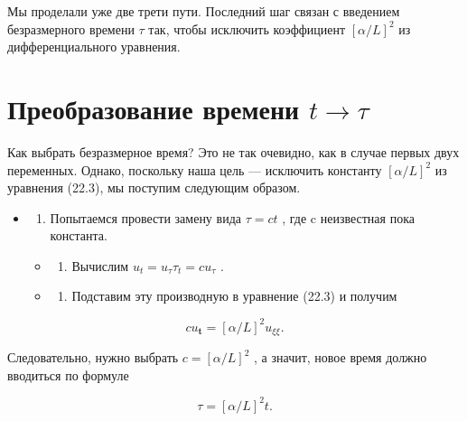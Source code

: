 \documentclass[
  ukrainian,
]{article}
\providecommand{\tightlist}{%
  \setlength{\itemsep}{0pt}\setlength{\parskip}{0pt}}
\begin{document}
Мы проделали уже две трети пути. Последний шаг связан с введением
безразмерного времени \(\tau\) так, чтобы исключить коэффициент
\([\alpha/L]^2\) из дифференциального уравнения.

\section{\texorpdfstring{Преобразование времени
\(t \rightarrow \tau\)}{Преобразование времени t \textbackslash rightarrow \textbackslash tau}}\label{ux43fux440ux435ux43eux431ux440ux430ux437ux43eux432ux430ux43dux438ux435-ux432ux440ux435ux43cux435ux43dux438-t-rightarrow-tau}

Как выбрать безразмерное время? Это не так очевидно, как в случае первых
двух переменных. Однако, поскольку наша цель --- исключить константу
\([\alpha/L]^2\) из уравнения (22.3), мы поступим следующим образом.

\begin{itemize}
\item
  \begin{enumerate}
  \def\labelenumi{\arabic{enumi}.}
  \tightlist
  \item
    Попытаемся провести замену вида \(\tau = ct\) , где c неизвестная
    пока константа.
  \end{enumerate}

  \begin{itemize}
  \tightlist
  \item
    \begin{enumerate}
    \def\labelenumi{\arabic{enumi}.}
    \setcounter{enumi}{1}
    \tightlist
    \item
      Вычислим \(u_t = u_{\tau} \tau_t = c u_{\tau}\) .
    \end{enumerate}
  \item
    \begin{enumerate}
    \def\labelenumi{\arabic{enumi}.}
    \setcounter{enumi}{2}
    \tightlist
    \item
      Подставим эту производную в уравнение (22.3) и получим
    \end{enumerate}
  \end{itemize}
\end{itemize}

\[
cu_{\mathbf{t}} = [\alpha/L]^2 u_{\xi\xi}.
\]

Следовательно, нужно выбрать \(c = [\alpha/L]^2\) , а значит, новое
время должно вводиться по формуле

\[
\tau = [\alpha/L]^2 t.
\]
\end{document}
